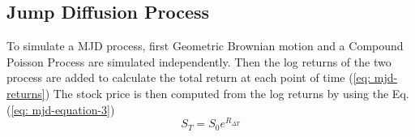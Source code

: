 \documentclass[paper.tex]{subfiles}
\begin{document}
    \subsection{Jump Diffusion Process}
        To simulate a MJD process, first Geometric Brownian motion and a Compound Poisson Process are simulated independently.
        Then the log returns of the two process are added to calculate the total return at each point of time (\ref{eq: mjd-returns})
        The stock price is then computed from the log returns by using the Eq. (\ref{eq: mjd-equation-3})
        \begin{equation}
            S_{T} = S_0e^{R_{\Delta T}}
        \end{equation}
\end{document}

